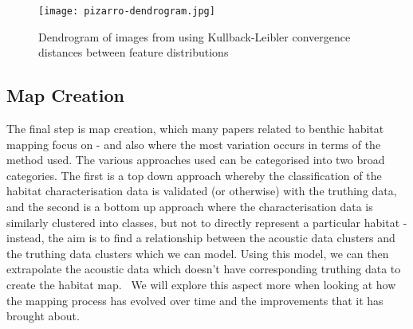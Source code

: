 \begin{figure}[H]
    \texttt{[image: pizarro-dendrogram.jpg]}
    \caption{Dendrogram of images from  \citet{pizarro09} using Kullback-Leibler convergence distances between feature distributions}
    \label{fig:sbes_mbes}
\end{figure}

\subsection{Map Creation}
The final step is map creation, which many papers related to benthic habitat mapping focus on - and also where the most variation occurs in terms of the method used. The various approaches used can be categorised into two broad categories. The first is a top down approach whereby the classification of the habitat characterisation data is validated (or otherwise) with the truthing data, and the second is a bottom up approach where the characterisation data is similarly clustered into classes, but not to directly represent a particular habitat - instead, the aim is to find a relationship between the acoustic data clusters and the truthing data clusters which we can model. Using this model, we can then extrapolate the acoustic data which doesn't have corresponding truthing data to create the habitat map.~\citep{ahsan11} We will explore this aspect more when looking at how the mapping process has evolved over time and the improvements that it has brought about.

